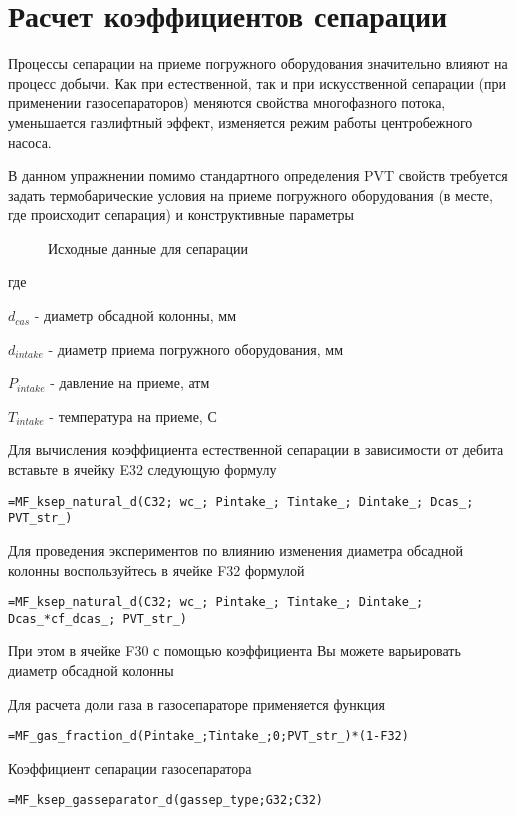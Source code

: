 \section{Расчет коэффициентов сепарации}

Процессы сепарации на приеме погружного оборудования значительно влияют на процесс добычи. Как при естественной, так и при искусственной сепарации (при применении газосепараторов) меняются свойства многофазного потока, уменьшается газлифтный эффект, изменяется режим работы центробежного насоса.

В данном упражнении помимо стандартного определения PVT свойств требуется задать термобарические условия на приеме погружного оборудования (в месте, где происходит сепарация) и конструктивные параметры


\begin{figure}[h!]
	\center{\texttt{[image: Ex60\_1]}}
	\caption{Исходные данные для сепарации}
	\label{ris:Ex60_1}
\end{figure}

где

$d_{cas}$ - диаметр обсадной колонны, мм

$d_{intake}$ - диаметр приема погружного оборудования, мм

$P_{intake}$ - давление на приеме, атм

$T_{intake}$ - температура на приеме, С

Для вычисления коэффициента естественной сепарации в зависимости от дебита вставьте в ячейку E32 следующую формулу 

{ \small  \texttt{=MF\_ksep\_natural\_d(C32; wc\_; Pintake\_; Tintake\_; Dintake\_; Dcas\_; PVT\_str\_)}}

Для проведения экспериментов по влиянию изменения диаметра обсадной колонны воспользуйтесь в ячейке F32 формулой

{ \small  \texttt{=MF\_ksep\_natural\_d(C32; wc\_; Pintake\_; Tintake\_; Dintake\_; Dcas\_*cf\_dcas\_; PVT\_str\_)}}

При этом в ячейке F30 с помощью коэффициента Вы можете варьировать диаметр обсадной колонны

Для расчета доли газа в газосепараторе применяется функция

{ \small  \texttt{=MF\_gas\_fraction\_d(Pintake\_;Tintake\_;0;PVT\_str\_)*(1-F32)
}}

Коэффициент сепарации газосепаратора

{ \small  \texttt{=MF\_ksep\_gasseparator\_d(gassep\_type;G32;C32)
}}

